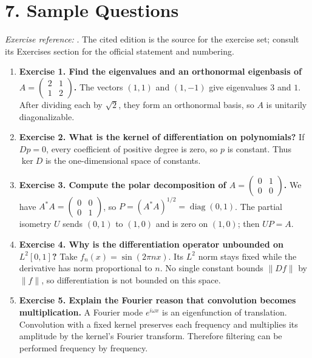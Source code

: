 \section*{7. Sample Questions}
\emph{Exercise reference:} \cite{operator_theory_ref1}. The cited edition is the source for the exercise set; consult its Exercises section for the official statement and numbering.
\begin{enumerate}[leftmargin=*,itemsep=0.9em]
\item \textbf{Exercise 1. Find the eigenvalues and an orthonormal eigenbasis of $A=\begin{pmatrix}2&1\\1&2\end{pmatrix}$.} The vectors $(1,1)$ and $(1,-1)$ give eigenvalues $3$ and $1$. After dividing each by $\sqrt2$, they form an orthonormal basis, so $A$ is unitarily diagonalizable.

\item \textbf{Exercise 2. What is the kernel of differentiation on polynomials?} If $Dp=0$, every coefficient of positive degree is zero, so $p$ is constant. Thus $\ker D$ is the one-dimensional space of constants.

\item \textbf{Exercise 3. Compute the polar decomposition of $A=\begin{pmatrix}0&1\\0&0\end{pmatrix}$.} We have $A^*A=\begin{pmatrix}0&0\\0&1\end{pmatrix}$, so $P=(A^*A)^{1/2}=\operatorname{diag}(0,1)$. The partial isometry $U$ sends $(0,1)$ to $(1,0)$ and is zero on $(1,0)$; then $UP=A$.

\item \textbf{Exercise 4. Why is the differentiation operator unbounded on $L^2[0,1]$?} Take $f_n(x)=\sin(2\pi n x)$. Its $L^2$ norm stays fixed while the derivative has norm proportional to $n$. No single constant bounds $\|Df\|$ by $\|f\|$, so differentiation is not bounded on this space.

\item \textbf{Exercise 5. Explain the Fourier reason that convolution becomes multiplication.} A Fourier mode $e^{i\omega x}$ is an eigenfunction of translation. Convolution with a fixed kernel preserves each frequency and multiplies its amplitude by the kernel's Fourier transform. Therefore filtering can be performed frequency by frequency.

\end{enumerate}
